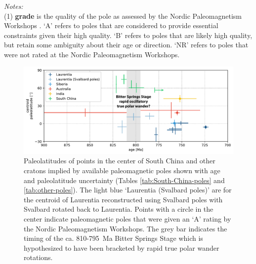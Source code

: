 \begin{table}[h!]
\scriptsize
\flushleft \emph{Notes:} \\
(1) \textbf{grade} is the quality of the pole as assessed by the Nordic Paleomagnetism Workshops \citep{Evans2021a}. `A' refers to poles that are considered to provide essential constraints given their high quality. `B'
refers to poles that are likely high quality, but retain some ambiguity about their age or direction. `NR' refers to poles that were not rated at the Nordic Paleomagnetism Workshops. \\
\label{tab:other-poles}
\end{table}

\begin{figure}[h!]
    \centering
    \includegraphics[width=\textwidth]{figures/Xiajiang/centroid-paleolatitudes.pdf}
    \caption[Paleolatitudes of points in the center of South China and other cratons implied by available paleomagnetic poles.]{Paleolatitudes of points in the center of South China and other cratons implied by available paleomagnetic poles shown with age and paleolatitude uncertainty (Tables \ref{tab:South-China-poles} and \ref{tab:other-poles}). The light blue `Laurentia (Svalbard poles)' are for the centroid of Laurentia reconstructed using Svalbard poles with Svalbard rotated back to Laurentia. Points with a circle in the center indicate paleomagnetic poles that were given an `A' rating by the Nordic Paleomagnetism Workshops. The grey bar indicates the timing of the ca. 810-795~Ma Bitter Springs Stage which is hypothesized to have been bracketed by rapid true polar wander rotations.}
    \label{fig:centroid-paleolatitudes}
\end{figure}


